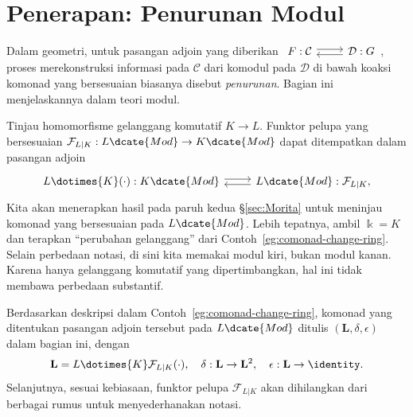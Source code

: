 
\section{Penerapan: Penurunan Modul}\label{sec:descent-modules}
\hypertarget{o014.aljabr2.chapter7.module-descent}{ }
Dalam geometri, untuk pasangan adjoin yang diberikan
$\begin{tikzcd}
	F: \mathcal{C} \arrow[shift left, r] & \mathcal{D}: G \arrow[shift left, l]
\end{tikzcd}$,
proses merekonstruksi informasi pada $\mathcal{C}$ dari komodul pada
$\mathcal{D}$ di bawah koaksi komonad yang bersesuaian biasanya disebut
\emph{penurunan}. Bagian ini menjelaskannya dalam teori modul.

Tinjau homomorfisme gelanggang komutatif $K\to L$. Funktor pelupa yang
bersesuaian $\mathcal{F}_{L|K}:L\dcate{Mod}\to K\dcate{Mod}$ dapat
ditempatkan dalam pasangan adjoin
\[\begin{tikzcd}
	L \dotimes{K} (\cdot): K\dcate{Mod} \arrow[shift left, r] & L\dcate{Mod} : \mathcal{F}_{L|K}, \arrow[shift left, l]
\end{tikzcd}\]
Kita akan menerapkan hasil pada paruh kedua \S\ref{sec:Morita} untuk meninjau
komonad yang bersesuaian pada $L\dcate{Mod}$. Lebih tepatnya, ambil
$\Bbbk=K$ dan terapkan ``perubahan gelanggang'' dari
Contoh~\ref{eg:comonad-change-ring}. Selain perbedaan notasi, di sini kita
memakai modul kiri, bukan modul kanan. Karena hanya gelanggang komutatif yang
dipertimbangkan, hal ini tidak membawa perbedaan substantif.

Berdasarkan deskripsi dalam Contoh~\ref{eg:comonad-change-ring}, komonad yang
ditentukan pasangan adjoin tersebut pada $L\dcate{Mod}$ ditulis
$(\mathbf{L},\delta,\epsilon)$ dalam bagian ini, dengan
\[ \mathbf{L} = L \dotimes{K} \mathcal{F}_{L|K}(\cdot), \quad \delta: \mathbf{L} \to \mathbf{L}^2, \quad \epsilon: \mathbf{L} \to \identity. \]
Selanjutnya, sesuai kebiasaan, funktor pelupa $\mathcal{F}_{L|K}$ akan
dihilangkan dari berbagai rumus untuk menyederhanakan notasi.

